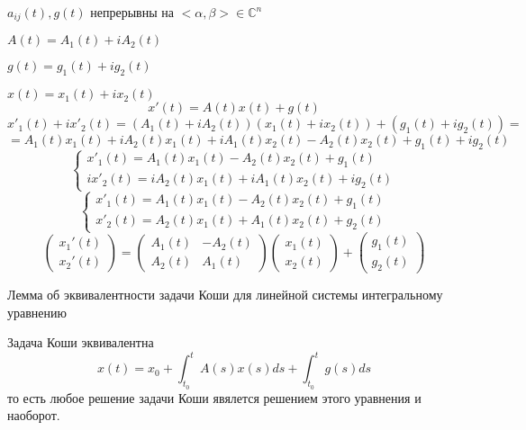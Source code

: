 \begin{block}
  $a_{ij}(t), g(t)$ непрерывны на $<\alpha, \beta> \in \mathbb{C}^n$

  $A(t) = A_1(t) + iA_2(t)$

  $g(t) = g_1(t) + ig_2(t)$

  $x(t) = x_1(t) + ix_2(t)$
  $$
  x'(t) = A(t)x(t) + g(t)
  $$
  $$
  x'_1(t) + ix'_2(t) = (A_1(t) + iA_2(t)) (x_1(t) + ix_2(t)) +
  (g_1(t) + ig_2(t)) =
  $$
  $$
  = A_1(t)x_1(t) + iA_2(t)x_1(t) + iA_1(t)x_2(t) - A_2(t)x_2(t) +
  g_1(t) + ig_2(t)
  $$
  $$
  \left\{
  \begin{array}{l}
    x'_1(t) = A_1(t)x_1(t) - A_2(t)x_2(t) + g_1(t) \\
    ix'_2(t) = iA_2(t)x_1(t) + iA_1(t)x_2(t) + ig_2(t)
  \end{array}
  \right.
  $$
  $$
  \left\{
  \begin{array}{l}
    x'_1(t) = A_1(t)x_1(t) - A_2(t)x_2(t) + g_1(t) \\
    x'_2(t) = A_2(t)x_1(t) + A_1(t)x_2(t) + g_2(t)
  \end{array}
  \right.
  $$
  $$
  \left(
  \begin{array}{c}
    x_1'(t) \\
    x_2'(t)
  \end{array}
  \right) =
  \left(
  \begin{array}{cc}
    A_1(t) & -A_2(t) \\
    A_2(t) & A_1(t)
  \end{array}
  \right)
  \left(
  \begin{array}{c}
    x_1(t) \\
    x_2(t)
  \end{array}
  \right) +
  \left(
  \begin{array}{c}
    g_1(t) \\
    g_2(t)
  \end{array}
  \right)
  $$
\end{block}

\begin{title}[\Large]
  Лемма об эквивалентности задачи Коши для линейной системы интегральному
  уравнению
\end{title}

\begin{block}
  Задача Коши эквивалентна
  $$
  x(t) = x_0 + \int_{t_0}^t A(s)x(s)ds +
  \int_{t_0}^t g(s)ds
  $$
  то есть любое решение задачи Коши явялется решением этого уравнения и наоборот.
\end{block}

